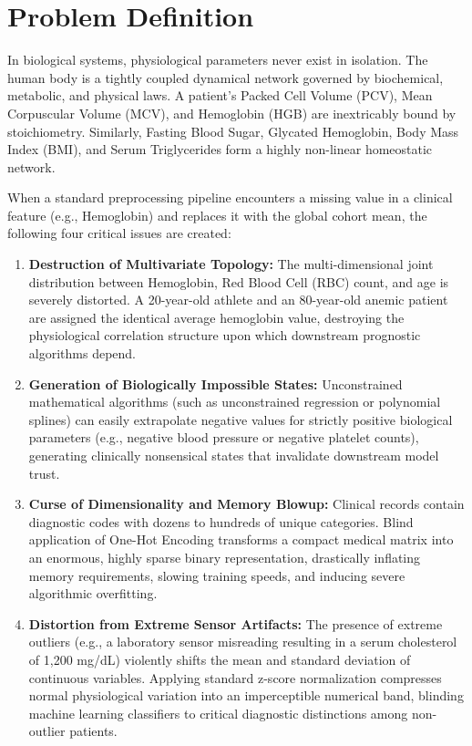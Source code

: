 \documentclass[MTech]{ugthesis}
\begin{document}
\section{Problem Definition}
In biological systems, physiological parameters never exist in isolation. The human body is a tightly coupled dynamical network governed by biochemical, metabolic, and physical laws. A patient's Packed Cell Volume (\acs{PCV}), Mean Corpuscular Volume (\acs{MCV}), and Hemoglobin (\acs{HGB}) are inextricably bound by stoichiometry. Similarly, Fasting Blood Sugar, Glycated Hemoglobin, Body Mass Index (\acs{BMI}), and Serum Triglycerides form a highly non-linear homeostatic network.

When a standard preprocessing pipeline encounters a missing value in a clinical feature (e.g., Hemoglobin) and replaces it with the global cohort mean, the following four critical issues are created:
\begin{enumerate}
    \item \textbf{Destruction of Multivariate Topology:} The multi-dimensional joint distribution between Hemoglobin, Red Blood Cell (\acs{RBC}) count, and age is severely distorted. A 20-year-old athlete and an 80-year-old anemic patient are assigned the identical average hemoglobin value, destroying the physiological correlation structure upon which downstream prognostic algorithms depend.
    \item \textbf{Generation of Biologically Impossible States:} Unconstrained mathematical algorithms (such as unconstrained regression or polynomial splines) can easily extrapolate negative values for strictly positive biological parameters (e.g., negative blood pressure or negative platelet counts), generating clinically nonsensical states that invalidate downstream model trust.
    \item \textbf{Curse of Dimensionality and Memory Blowup:} Clinical records contain diagnostic codes with dozens to hundreds of unique categories. Blind application of One-Hot Encoding transforms a compact medical matrix into an enormous, highly sparse binary representation, drastically inflating memory requirements, slowing training speeds, and inducing severe algorithmic overfitting.
    \item \textbf{Distortion from Extreme Sensor Artifacts:} The presence of extreme outliers (e.g., a laboratory sensor misreading resulting in a serum cholesterol of 1,200 mg/dL) violently shifts the mean and standard deviation of continuous variables. Applying standard z-score normalization compresses normal physiological variation into an imperceptible numerical band, blinding machine learning classifiers to critical diagnostic distinctions among non-outlier patients.
\end{enumerate}
\end{document}
